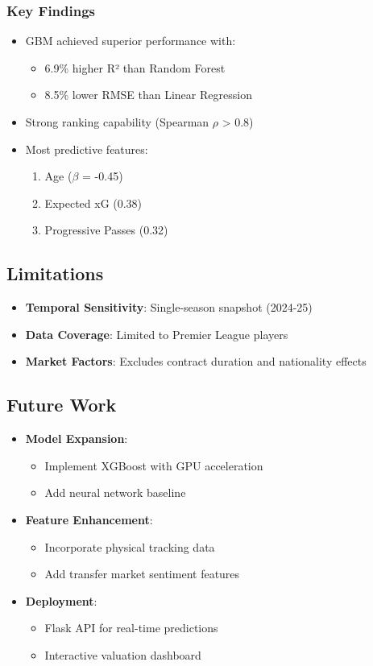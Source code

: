 \documentclass[12pt,a4paper]{article}
\begin{document}
\subsubsection{Key Findings}
\begin{itemize}
    \item GBM achieved superior performance with:
    \begin{itemize}
        \item 6.9\% higher R² than Random Forest
        \item 8.5\% lower RMSE than Linear Regression
    \end{itemize}
    \item Strong ranking capability (Spearman $\rho$ > 0.8)
    \item Most predictive features:
    \begin{enumerate}
        \item Age ($\beta$ = -0.45)
        \item Expected xG (0.38)
        \item Progressive Passes (0.32)
    \end{enumerate}
\end{itemize}

\subsection{Limitations}
\begin{itemize}
    \item \textbf{Temporal Sensitivity}: Single-season snapshot (2024-25)
    \item \textbf{Data Coverage}: Limited to Premier League players
    \item \textbf{Market Factors}: Excludes contract duration and nationality effects
\end{itemize}

\subsection{Future Work}
\begin{itemize}
    \item \textbf{Model Expansion}:
    \begin{itemize}
        \item Implement XGBoost with GPU acceleration
        \item Add neural network baseline
    \end{itemize}
    \item \textbf{Feature Enhancement}:
    \begin{itemize}
        \item Incorporate physical tracking data
        \item Add transfer market sentiment features
    \end{itemize}
    \item \textbf{Deployment}:
    \begin{itemize}
        \item Flask API for real-time predictions
        \item Interactive valuation dashboard
    \end{itemize}
\end{itemize}
\end{document}
